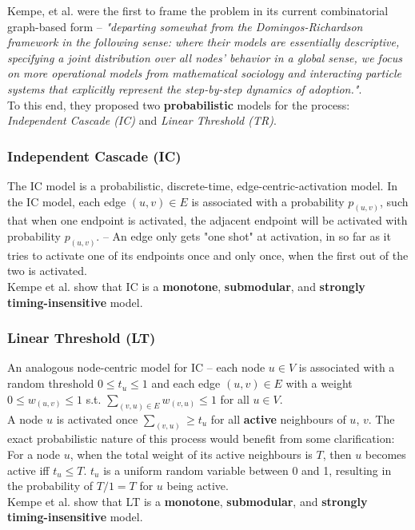 \documentclass[twocolumn, 10pt]{article}
\begin{document}
Kempe, et al. \cite{kempe} were the first to frame the problem in its current combinatorial graph-based form -- \textit{"departing somewhat from the Domingos-Richardson framework in the following sense: where their models are essentially descriptive, specifying a joint distribution over all nodes’ behavior in a global sense, we focus on more operational models from mathematical sociology and interacting particle systems that explicitly represent the step-by-step dynamics
of adoption."}\cite{kempe}. \\
To this end, they proposed two \textbf{probabilistic} models for the process: \textit{Independent Cascade (IC)} and \textit{Linear Threshold (TR)}.
\subsubsection{Independent Cascade (IC)}
The IC model is a probabilistic, discrete-time, edge-centric-activation model. In the IC model, each edge $(u, v) \in E$ is associated with a probability $p_{(u, v)}$, such that when one endpoint is activated, the adjacent endpoint will be activated with probability $p_{(u, v)}$. -- An edge only gets "one shot" at activation, in so far as it tries to activate one of its endpoints once and only once, when the first out of the two is activated.\\
Kempe et al. show that IC is a \textbf{monotone}, \textbf{submodular}, and \textbf{strongly timing-insensitive} model.
\subsubsection{Linear Threshold (LT)}
An analogous node-centric model for IC -- each node $u \in V$ is associated with a random threshold $0 \le t_u \le 1$ and each edge $(u, v) \in E$ with a weight $0 \le w_{(u, v)} \le 1$ s.t. $\sum_{(v, u) \in E} w_{(v, u)} \le 1$ for all $u \in V$.  \\
A node $u$ is activated once $\sum_{(v, u)} \ge t_u$ for all \textbf{active} neighbours of $u$, $v$. The exact probabilistic nature of this process would benefit from some clarification: \\
For a node $u$, when the total weight of its active neighbours is $T$, then $u$ becomes active iff $t_u \leq T$. $t_u$ is a uniform random variable between 0 and 1, resulting in the probability of $T/1=T$ for $u$ being active.  \\
Kempe et al. show that LT is a \textbf{monotone}, \textbf{submodular}, and \textbf{strongly timing-insensitive} model.
\end{document}
